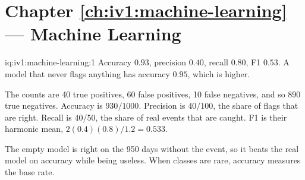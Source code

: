 \section*{Chapter \ref{ch:iv1:machine-learning} --- Machine Learning}

\begin{solution}{iq:iv1:machine-learning:1}
Accuracy $0.93$, precision $0.40$, recall $0.80$, F1 $0.53$. A model that never flags anything has accuracy $0.95$, which is higher.

The counts are 40 true positives, 60 false positives, 10 false negatives, and so 890 true negatives. Accuracy is $930/1000$. Precision is $40/100$, the share of flags that are right. Recall is $40/50$, the share of real events that are caught. F1 is their harmonic mean, $2(0.4)(0.8)/1.2 = 0.533$.

The empty model is right on the 950 days without the event, so it beats the real model on accuracy while being useless. When classes are rare, accuracy measures the base rate.



\end{solution}


